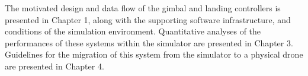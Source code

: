 The motivated design and data flow of the gimbal and landing controllers is presented in Chapter 1, along with the supporting software infrastructure, and conditions of the simulation environment. Quantitative analyses of the performances of these systems within the simulator are presented in Chapter 3. Guidelines for the migration of this system from the simulator to a physical drone are presented in Chapter 4.